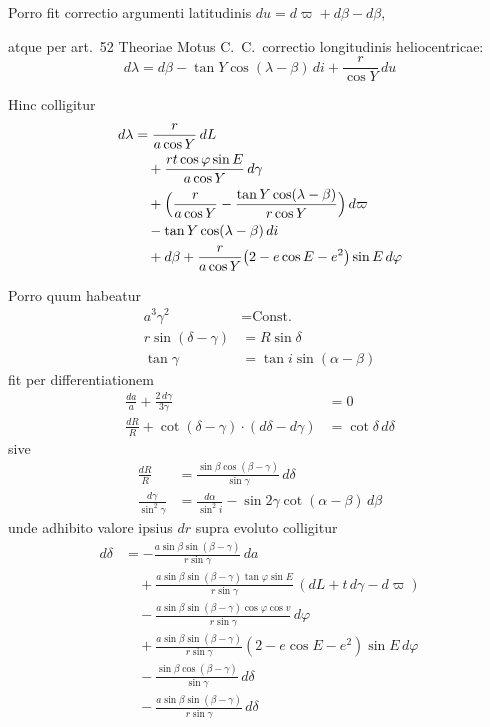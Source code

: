 \documentclass[12pt,a4paper]{article}
\begin{document}
Porro fit correctio argumenti latitudinis $du = d\varpi + d\beta - d\beta$,

atque per art.\ 52 Theoriae Motus C.\ C.\ correctio longitudinis heliocentricae:
\[
d\lambda = d\beta - \tan Y\cos(\lambda - \beta)\,di + \frac{r}{\cos Y}\,du
\]

Hinc colligitur
\begin{align*}
d\lambda &= \frac{r}{a\cos Y}\,dL \\
&\quad + \frac{rt\cos\varphi\sin E}{a\cos Y}\,d\gamma \\
&\quad + \Bigl(\frac{r}{a\cos Y} - \frac{\tan Y\cos(\lambda - \beta)}{r\cos Y}\Bigr)\,d\varpi \\
&\quad - \tan Y\cos(\lambda - \beta)\,di \\
&\quad + d\beta + \frac{r}{a\cos Y}\bigl(2 - e\cos E - e^2\bigr)\sin E\,d\varphi
\end{align*}

Porro quum habeatur
\begin{align*}
a^3\gamma^2 &= \text{Const.} \\
r\sin(\delta - \gamma) &= R\sin\delta \\
\tan\gamma &= \tan i\sin(\alpha - \beta)
\end{align*}
fit per differentiationem
\begin{align*}
\frac{da}{a} + \frac{2\,d\gamma}{3\gamma} &= 0 \\
\frac{dR}{R} + \cot(\delta - \gamma)\cdot(d\delta - d\gamma) &= \cot\delta\,d\delta
\end{align*}
sive
\begin{align*}
\frac{dR}{R} &= \frac{\sin\beta\cos(\beta - \gamma)}{\sin\gamma}\,d\delta \\
\frac{d\gamma}{\sin^2\gamma} &= \frac{d\alpha}{\sin^2 i} - \sin 2\gamma\cot(\alpha - \beta)\,d\beta
\end{align*}
unde adhibito valore ipsius $dr$ supra evoluto colligitur
\begin{align*}
d\delta &= -\frac{a\sin\beta\sin(\beta - \gamma)}{r\sin\gamma}\,da \\
&\quad + \frac{a\sin\beta\sin(\beta - \gamma)\tan\varphi\sin E}{r\sin\gamma}\,(dL + t\,d\gamma - d\varpi) \\
&\quad - \frac{a\sin\beta\sin(\beta - \gamma)\cos\varphi\cos v}{r\sin\gamma}\,d\varphi \\
&\quad + \frac{a\sin\beta\sin(\beta - \gamma)}{r\sin\gamma}(2 - e\cos E - e^2)\sin E\,d\varphi \\
&\quad - \frac{\sin\beta\cos(\beta - \gamma)}{\sin\gamma}\,d\delta \\
&\quad - \frac{a\sin\beta\sin(\beta - \gamma)}{r\sin\gamma}\,d\delta
\end{align*}
\end{document}
